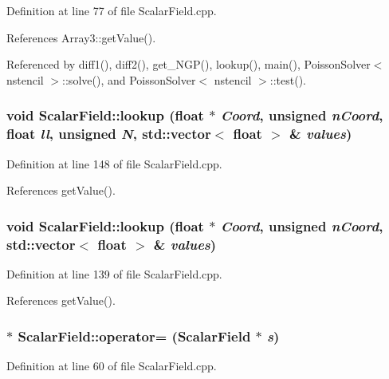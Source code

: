 Definition at line 77 of file ScalarField.cpp.



References Array3::getValue().



Referenced by diff1(), diff2(), get\_\-NGP(), lookup(), main(), PoissonSolver$<$ nstencil $>$::solve(), and PoissonSolver$<$ nstencil $>$::test().

\subsubsection[{lookup}]{\setlength{\rightskip}{0pt plus 5cm}void ScalarField::lookup (float $\ast$ {\em Coord}, \/  unsigned {\em nCoord}, \/  float {\em ll}, \/  unsigned {\em N}, \/  std::vector$<$ float $>$ \& {\em values})}\label{classScalarField_a11cbe92b79dc3488bb6d300c033830b2}


Definition at line 148 of file ScalarField.cpp.



References getValue().

\subsubsection[{lookup}]{\setlength{\rightskip}{0pt plus 5cm}void ScalarField::lookup (float $\ast$ {\em Coord}, \/  unsigned {\em nCoord}, \/  std::vector$<$ float $>$ \& {\em values})}\label{classScalarField_a3f0ba3f07c8d9b7173295dd7fafef84c}


Definition at line 139 of file ScalarField.cpp.



References getValue().

\subsubsection[{operator=}]{ $\ast$ ScalarField::operator= ({\bf ScalarField} $\ast$ {\em s})}\label{classScalarField_a318c134b9f29a00d923559389d837aba}


Definition at line 60 of file ScalarField.cpp.



